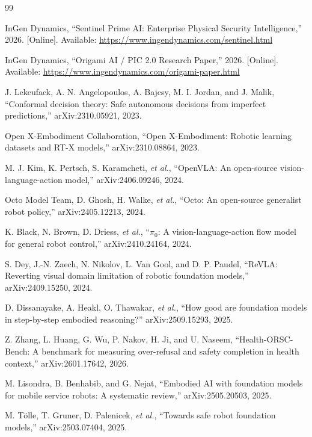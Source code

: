 \documentclass[conference]{IEEEtran}
\begin{document}
\begin{thebibliography}{99}

InGen Dynamics, ``Sentinel Prime AI: Enterprise Physical Security Intelligence,'' 2026. [Online]. Available: \url{https://www.ingendynamics.com/sentinel.html}

InGen Dynamics, ``Origami AI / PIC 2.0 Research Paper,'' 2026. [Online]. Available: \url{https://www.ingendynamics.com/origami-paper.html}

J. Lekeufack, A. N. Angelopoulos, A. Bajcsy, M. I. Jordan, and J. Malik, ``Conformal decision theory: Safe autonomous decisions from imperfect predictions,'' arXiv:2310.05921, 2023.

Open X-Embodiment Collaboration, ``Open X-Embodiment: Robotic learning datasets and RT-X models,'' arXiv:2310.08864, 2023.

M. J. Kim, K. Pertsch, S. Karamcheti, \emph{et al.}, ``OpenVLA: An open-source vision-language-action model,'' arXiv:2406.09246, 2024.

Octo Model Team, D. Ghosh, H. Walke, \emph{et al.}, ``Octo: An open-source generalist robot policy,'' arXiv:2405.12213, 2024.

K. Black, N. Brown, D. Driess, \emph{et al.}, ``$\pi_0$: A vision-language-action flow model for general robot control,'' arXiv:2410.24164, 2024.

S. Dey, J.-N. Zaech, N. Nikolov, L. Van Gool, and D. P. Paudel, ``ReVLA: Reverting visual domain limitation of robotic foundation models,'' arXiv:2409.15250, 2024.

D. Dissanayake, A. Heakl, O. Thawakar, \emph{et al.}, ``How good are foundation models in step-by-step embodied reasoning?'' arXiv:2509.15293, 2025.

Z. Zhang, L. Huang, G. Wu, P. Nakov, H. Ji, and U. Naseem, ``Health-ORSC-Bench: A benchmark for measuring over-refusal and safety completion in health context,'' arXiv:2601.17642, 2026.

M. Lisondra, B. Benhabib, and G. Nejat, ``Embodied AI with foundation models for mobile service robots: A systematic review,'' arXiv:2505.20503, 2025.

M. T{\"o}lle, T. Gruner, D. Palenicek, \emph{et al.}, ``Towards safe robot foundation models,'' arXiv:2503.07404, 2025.


\end{thebibliography}
\end{document}
